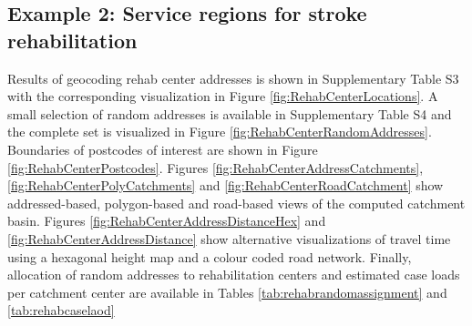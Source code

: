 \documentclass[utf8]{frontiersHLTH}
\begin{document}
\subsection{Example 2: Service regions for stroke rehabilitation} 
Results of geocoding rehab center addresses is shown in Supplementary
Table S3 with the corresponding visualization in Figure
\ref{fig:RehabCenterLocations}. A small selection of random addresses
is available in Supplementary Table S4 and the complete set is
visualized in Figure \ref{fig:RehabCenterRandomAddresses}. Boundaries
of postcodes of interest are shown in Figure
\ref{fig:RehabCenterPostcodes}. Figures
\ref{fig:RehabCenterAddressCatchments},
\ref{fig:RehabCenterPolyCatchments} and
\ref{fig:RehabCenterRoadCatchment} show addressed-based, polygon-based
and road-based views of the computed catchment basin. Figures
\ref{fig:RehabCenterAddressDistanceHex} and
\ref{fig:RehabCenterAddressDistance} show alternative visualizations
of travel time using a hexagonal height map and a colour coded road
network. Finally, allocation of random addresses to rehabilitation
centers and estimated case loads per catchment center are available in
Tables \ref{tab:rehabrandomassignment} and \ref{tab:rehabcaselaod}
\end{document}
